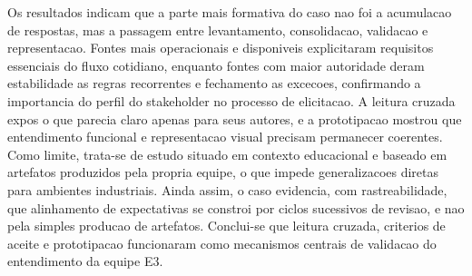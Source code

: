 \documentclass[12pt]{article}
\begin{document}
%
%
Os resultados indicam que a parte mais formativa do caso nao foi a acumulacao de respostas, mas a passagem entre levantamento, consolidacao, validacao e representacao. Fontes mais operacionais e disponiveis explicitaram requisitos essenciais do fluxo cotidiano, enquanto fontes com maior autoridade deram estabilidade as regras recorrentes e fechamento as excecoes, confirmando a importancia do perfil do stakeholder no processo de elicitacao. A leitura cruzada expos o que parecia claro apenas para seus autores, e a prototipacao mostrou que entendimento funcional e representacao visual precisam permanecer coerentes. Como limite, trata-se de estudo situado em contexto educacional e baseado em artefatos produzidos pela propria equipe, o que impede generalizacoes diretas para ambientes industriais. Ainda assim, o caso evidencia, com rastreabilidade, que alinhamento de expectativas se constroi por ciclos sucessivos de revisao, e nao pela simples producao de artefatos. Conclui-se que leitura cruzada, criterios de aceite e prototipacao funcionaram como mecanismos centrais de validacao do entendimento da equipe E3.
\end{document}
